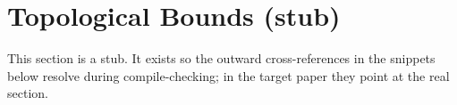 \documentclass[11pt,a4paper]{article}
\begin{document}
\section{Topological Bounds (stub)}\label{sec:topological_bounds}
This section is a stub. It exists so the outward cross-references in the
snippets below resolve during compile-checking; in the target paper they point
at the real section.


\end{document}
